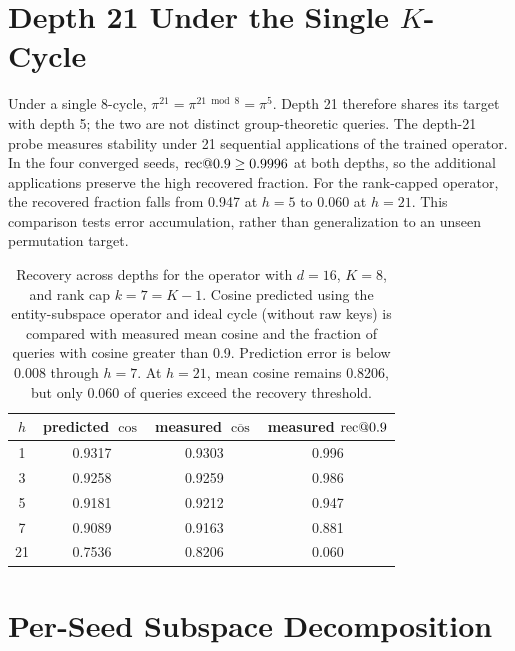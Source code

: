 \appendix

\section{Depth 21 Under the Single $K$-Cycle}
\label{app:period}

Under a single 8-cycle, $\pi^{21} = \pi^{21 \bmod 8} = \pi^{5}$.
Depth 21 therefore shares its target with depth 5; the two are not
distinct group-theoretic queries. The depth-21 probe measures
stability under 21 sequential applications of the trained operator.
In the four converged seeds, $\mathrm{rec}@0.9 \geq 0.9996$ at both depths,
so the additional applications preserve the high recovered fraction.
For the rank-capped operator, the recovered fraction falls from
0.947 at $h{=}5$ to 0.060 at $h{=}21$.
This comparison tests error accumulation, rather than generalization
to an unseen permutation target.

\begin{table}[H]
\centering
\small
\begin{tabular}{cccc}
\toprule
$h$ & predicted $\cos$ & measured $\overline{\cos}$ & measured $\mathrm{rec}@0.9$ \\
\midrule
1  & 0.9317 & 0.9303 & 0.996 \\
3  & 0.9258 & 0.9259 & 0.986 \\
5  & 0.9181 & 0.9212 & 0.947 \\
7  & 0.9089 & 0.9163 & 0.881 \\
21 & 0.7536 & 0.8206 & 0.060 \\
\bottomrule
\end{tabular}
\caption{Recovery across depths for the operator with $d=16$, $K=8$,
and rank cap $k = 7 = K - 1$. Cosine predicted using the entity-subspace operator and ideal cycle
(without raw keys) is compared with measured mean cosine and the
fraction of queries with cosine greater than 0.9. Prediction error
is below 0.008 through $h = 7$. At $h = 21$, mean cosine remains
0.8206, but only 0.060 of queries exceed the recovery threshold.}
\label{tab:depthcurve}
\end{table}

\section{Per-Seed Subspace Decomposition}
\label{app:subspace}

